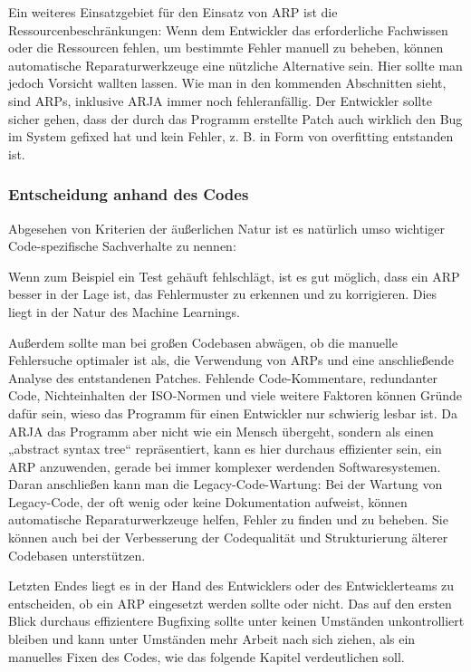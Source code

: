 \documentclass[11pt,a4paper]{article}
\begin{document}
Ein weiteres Einsatzgebiet für den Einsatz von ARP ist die Ressourcenbeschränkungen: Wenn dem Entwickler das erforderliche Fachwissen oder die Ressourcen fehlen, um bestimmte Fehler manuell zu beheben, können automatische Reparaturwerkzeuge eine nützliche Alternative sein.  Hier sollte man jedoch Vorsicht wallten lassen. Wie man in den kommenden Abschnitten sieht, sind ARPs, inklusive ARJA immer noch fehleranfällig. Der Entwickler sollte sicher gehen, dass der durch das Programm erstellte Patch auch wirklich den Bug im System gefixed hat und kein Fehler, z. B. in Form von overfitting entstanden ist.

\subsubsection{Entscheidung anhand des Codes}

Abgesehen von Kriterien der äußerlichen Natur ist es natürlich umso wichtiger Code-spezifische Sachverhalte zu nennen:

Wenn zum Beispiel ein Test gehäuft fehlschlägt, ist es gut möglich, dass ein ARP besser in der Lage ist, das Fehlermuster zu erkennen und zu korrigieren. Dies liegt in der Natur des Machine Learnings.

Außerdem sollte man bei großen Codebasen abwägen, ob die manuelle Fehlersuche optimaler ist als, die Verwendung von ARPs und eine anschließende Analyse des entstandenen Patches. Fehlende Code-Kommentare, redundanter Code, Nichteinhalten der ISO-Normen und viele weitere Faktoren können Gründe dafür sein, wieso das Programm für einen Entwickler nur schwierig lesbar ist. Da ARJA das Programm aber nicht wie ein Mensch übergeht, sondern als einen „abstract syntax tree“ repräsentiert, kann es hier durchaus effizienter sein, ein ARP anzuwenden, gerade bei immer komplexer werdenden Softwaresystemen. Daran anschließen kann man die Legacy-Code-Wartung:
Bei der Wartung von Legacy-Code, der oft wenig oder keine Dokumentation aufweist, können automatische Reparaturwerkzeuge helfen, Fehler zu finden und zu beheben. Sie können auch bei der Verbesserung der Codequalität und Strukturierung älterer Codebasen unterstützen.

Letzten Endes liegt es in der Hand des Entwicklers oder des Entwicklerteams zu entscheiden, ob ein ARP eingesetzt werden sollte oder nicht. Das auf den ersten Blick durchaus effizientere Bugfixing sollte unter keinen Umständen unkontrolliert bleiben und kann unter Umständen mehr Arbeit nach sich ziehen, als ein manuelles Fixen des Codes, wie das folgende Kapitel verdeutlichen soll.
\end{document}
